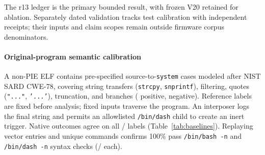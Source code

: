 The r13 ledger is the primary bounded result, with frozen V20 retained for ablation. Separately dated validation tracks test calibration with independent receipts; their inputs and claim scopes remain outside firmware corpus denominators.

\paragraph{Original-program semantic calibration}
A non-PIE ELF contains \TSDSReviewControlledCases{} pre-specified source-to-\texttt{system} cases modeled after NIST SARD CWE-78, covering string transfers (\texttt{strcpy}, \texttt{snprintf}), filtering, quotes (\texttt{"..."}, \texttt{'...'}), truncation, and branches (\TSDSReviewControlledPositive{} positive, \TSDSReviewControlledNegative{} negative). Reference labels are fixed before analysis; fixed inputs traverse the program. An interposer logs the final string and permits an allowlisted \texttt{/bin/dash} child to create an inert trigger. Native outcomes agree on all \TSDSReviewControlledMatches{}/\TSDSReviewControlledCases{} labels (Table~\ref{tab:baselines}). Replaying \TSDSReviewWitnessEntriesNew{} vector entries and \TSDSReviewWitnessUniqueNew{} unique commands confirms 100\% pass \texttt{/bin/bash -n} and \texttt{/bin/dash -n} syntax checks (\TSDSReviewWitnessBashPass{}/\TSDSReviewWitnessUniqueNew{} each).

